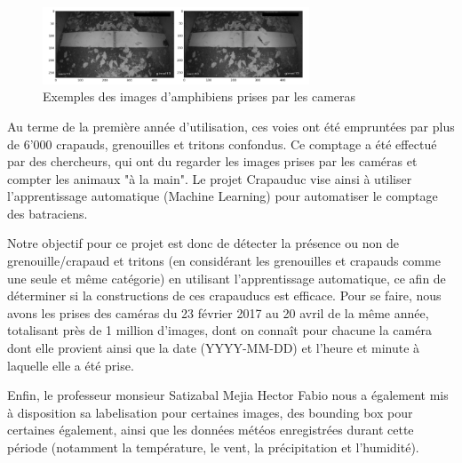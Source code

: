 \newpage

\begin{figure}[!htb]
    \centering
    \includegraphics[width=300px]{images/introduction_crapauduc_exemple_prise_camera.png}
    \caption{Exemples des images d'amphibiens prises par les cameras}
    \label{fig:Exemples des images d'amphibiens prises par les cameras}
\end{figure}

 Au terme de la première année d'utilisation, ces voies ont été empruntées par plus de 6'000 crapauds, grenouilles et tritons confondus. Ce comptage a été effectué par des chercheurs, qui ont du regarder les images prises par les caméras et compter les animaux "à la main". Le projet Crapauduc vise ainsi à utiliser l'apprentissage automatique (Machine Learning) pour automatiser le comptage des batraciens. \newline

Notre objectif pour ce projet est donc de détecter la présence ou non de grenouille/crapaud et tritons (en considérant les grenouilles et crapauds comme une seule et même catégorie) en utilisant l'apprentissage automatique, ce afin de déterminer si la constructions de ces crapauducs est efficace. Pour se faire, nous avons les prises des caméras du 23 février 2017 au 20 avril de la même année, totalisant près de 1 million d'images, dont on connaît pour chacune la caméra dont elle provient ainsi que la date (YYYY-MM-DD) et l'heure et minute à laquelle elle a été prise.\newline

Enfin, le professeur monsieur Satizabal Mejia Hector Fabio nous a également mis à disposition sa labelisation pour certaines images, des bounding box pour certaines également, ainsi que les données météos enregistrées durant cette période (notamment la température, le vent, la précipitation et l'humidité).


